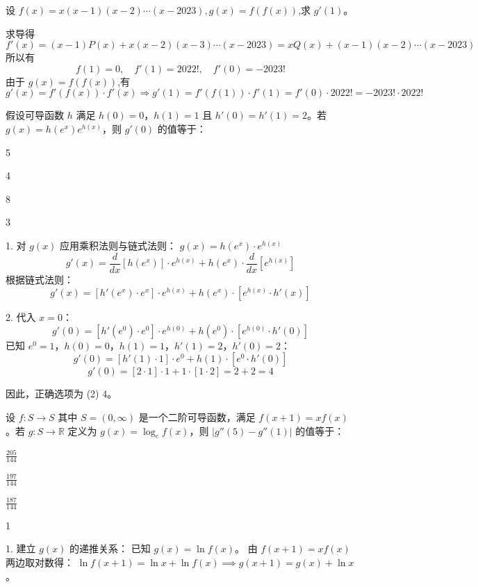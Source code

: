 \begin{questions}
    \question 设 $f(x)=x(x-1)(x-2)\cdots(x-2023),g(x)=f(f(x))$,求 $g'(1)$。
    \begin{solution}
        求导得
        \[
        f'(x) = (x-1)P(x) + x(x-2)(x-3)\cdots(x-2023) = xQ(x) + (x-1)(x-2)\cdots(x-2023)
        \]
        所以有
        \[
        f(1) = 0,\quad f'(1) = 2022!,\quad f'(0) = -2023!
        \]
        由于 $g(x) = f(f(x))$,有
        \[
        g'(x) = f'(f(x)) \cdot f'(x)\Rightarrow g'(1) = f'(f(1)) \cdot f'(1) = f'(0) \cdot 2022! = -2023! \cdot 2022!
        \]
    \end{solution}

    \question 
假设可导函数 $h$ 满足 $h(0) = 0$，$h(1) = 1$ 且 $h'(0) = h'(1) = 2$。若 $g(x) = h(e^x)e^{h(x)}$，则 $g'(0)$ 的值等于：
\begin{choices}
    \item 5
    \item 4
    \item 8
    \item 3
\end{choices}

\begin{solution}
1. 对 $g(x)$ 应用乘积法则与链式法则：
$g(x) = h(e^x) \cdot e^{h(x)}$
\[ g'(x) = \frac{d}{dx}[h(e^x)] \cdot e^{h(x)} + h(e^x) \cdot \frac{d}{dx}[e^{h(x)}] \]
根据链式法则：
\[ g'(x) = [h'(e^x) \cdot e^x] \cdot e^{h(x)} + h(e^x) \cdot [e^{h(x)} \cdot h'(x)] \]

2. 代入 $x = 0$：
\[ g'(0) = [h'(e^0) \cdot e^0] \cdot e^{h(0)} + h(e^0) \cdot [e^{h(0)} \cdot h'(0)] \]
已知 $e^0 = 1$，$h(0) = 0$，$h(1) = 1$，$h'(1) = 2$，$h'(0) = 2$：
\[ g'(0) = [h'(1) \cdot 1] \cdot e^0 + h(1) \cdot [e^0 \cdot h'(0)] \]
\[ g'(0) = [2 \cdot 1] \cdot 1 + 1 \cdot [1 \cdot 2] = 2 + 2 = 4 \]

因此，正确选项为 (2) 4。
\end{solution}

\question 
设 $f : S \to S$ 其中 $S = (0, \infty)$ 是一个二阶可导函数，满足 $f(x+1) = xf(x)$。若 $g : S \to \mathbb{R}$ 定义为 $g(x) = \log_e f(x)$，则 $|g''(5) - g''(1)|$ 的值等于：
\begin{choices}
    \item $\frac{205}{144}$
    \item $\frac{197}{144}$
    \item $\frac{187}{144}$
    \item 1
\end{choices}

\begin{solution}
1. 建立 $g(x)$ 的递推关系：
已知 $g(x) = \ln f(x)$。
由 $f(x+1) = xf(x)$ 两边取对数得：
$\ln f(x+1) = \ln x + \ln f(x) \implies g(x+1) = g(x) + \ln x$。


\end{solution}
\end{questions}
